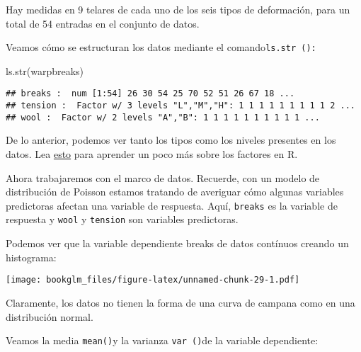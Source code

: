 \documentclass[
]{book}
\newenvironment{Shaded}{\begin{snugshade}}{\end{snugshade}}
\newcommand{\CommentTok}[1]{\textcolor[rgb]{0.56,0.35,0.01}{\textit{#1}}}
\newcommand{\FunctionTok}[1]{\textcolor[rgb]{0.00,0.00,0.00}{#1}}
\newcommand{\NormalTok}[1]{#1}
\newcommand{\SpecialCharTok}[1]{\textcolor[rgb]{0.00,0.00,0.00}{#1}}
\begin{document}
Hay medidas en 9 telares de cada uno de los seis tipos de deformación, para un total de 54 entradas en el conjunto de datos.

Veamos cómo se estructuran los datos mediante el comando\texttt{ls.str\ ():}

\begin{Shaded}
\begin{Highlighting}[]
\FunctionTok{ls.str}\NormalTok{(warpbreaks)}
\end{Highlighting}
\end{Shaded}

\begin{verbatim}
## breaks :  num [1:54] 26 30 54 25 70 52 51 26 67 18 ...
## tension :  Factor w/ 3 levels "L","M","H": 1 1 1 1 1 1 1 1 1 2 ...
## wool :  Factor w/ 2 levels "A","B": 1 1 1 1 1 1 1 1 1 1 ...
\end{verbatim}

De lo anterior, podemos ver tanto los tipos como los niveles presentes en los datos. Lea \href{https://www.statmethods.net/input/datatypes.html}{esto} para aprender un poco más sobre los factores en R.

Ahora trabajaremos con el marco de datos. Recuerde, con un modelo de distribución de Poisson estamos tratando de averiguar cómo algunas variables predictoras afectan una variable de respuesta. Aquí, \texttt{breaks} es la variable de respuesta y \texttt{wool} y \texttt{tension} son variables predictoras.

Podemos ver que la variable dependiente breaks de datos contínuos creando un histograma:

\begin{Shaded}
\end{Shaded}

\texttt{[image: bookglm\_files/figure-latex/unnamed-chunk-29-1.pdf]}

Claramente, los datos no tienen la forma de una curva de campana como en una distribución normal.

Veamos la media \texttt{mean()}y la varianza \texttt{var\ ()}de la variable dependiente:

\begin{Shaded}
\end{Shaded}
\end{document}
